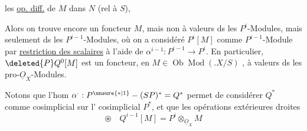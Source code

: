 les \uline{op. diff.} de $M$ dans $N$ (rel à $S$),

Alors on trouve encore un foncteur   $M$, mais  non à valeurs ds les $P^i$-Modules, mais  seulement ds les $P^{i-1}$-Modules, où on a considéré $P^i[M]$ comme $P^{i-1}$-Module par \uline{restriction des scalaires} à l'aide de $\alpha^{i-1}:P^{i-1}\longrightarrow P^i$.  En particulier, $\deleted{P}Q^0[M]$ est  un foncteur, en $M\in\operatorname{Ob}\operatorname{Mod}(.X/S)$ , à valeurs ds les pro-$\underline O_X$-Modules.
\margin{et qu'on utilise comme morphismes \unsure{de|des} \deleted{\unsure{objets|Modules}} \unsure{$\mathbb N$-pro-objets|N-pro-objets} ceux de Artin--Riesz, \unsure{Supposant|exprimant} qu'on ne considère que des op. diff de degré borné, ce qui est autom. si $X$ qu. cpct].}


Notons que l'hom $\alpha^{\cdot}:P^{\unsure{*|1}}\mathbin{-}(SP)^*=Q^*$ permet de considérer $Q^*$ comme    cosimplicial sur l' cosimplicial $P^*$, et que les opérations extérieures droites
\[
\boxed{\circledast\quad Q^{i-1}[M]=P^i\otimes_{\underline O_X} M}
\]

